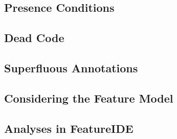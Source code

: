 

\subsection{Presence Conditions}

\subsection{Dead Code} %


\subsection{Superfluous Annotations}


\subsection{Considering the Feature Model}


\subsection{Analyses in FeatureIDE}
